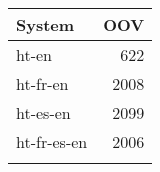 \begin{tabular}{lr} \toprule
System & OOV \\
\toprule
ht-en & 622 \\
		ht-fr-en & 2008 \\
		ht-es-en & 2099\\
		ht-fr-es-en & 2006 \\
\bottomrule
\small
\centering
\label{table:htesenoov}
\end{tabular}